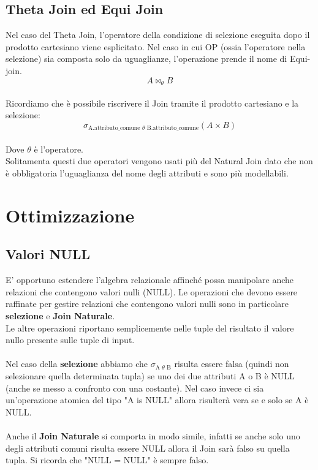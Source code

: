 \documentclass{report}
\begin{document}
\subsection{Theta Join ed Equi Join}
Nel caso del Theta Join, l'operatore della condizione di selezione eseguita dopo il prodotto cartesiano viene esplicitato. Nel caso in cui OP (ossia l'operatore nella selezione) sia composta solo da uguaglianze, l’operazione prende il nome di Equi-join.\\
$$ A \bowtie_{\text{$\theta$}}B$$\\
Ricordiamo che è possibile riscrivere il Join tramite il prodotto cartesiano e la selezione:\\
$$\sigma_{\text{A.attributo\_comune $\theta$ B.attributo\_comune}}(A \times B)$$\\
Dove $\theta$ è l'operatore.\\
Solitamenta questi due operatori vengono usati più del Natural Join dato che non è obbligatoria l'uguaglianza del nome degli attributi e sono più modellabili.\\

\newpage
\section{Ottimizzazione}
\subsection{Valori NULL}
E’ opportuno estendere l’algebra relazionale affinché possa manipolare anche relazioni che contengono valori nulli (NULL). Le operazioni che devono essere raffinate per gestire relazioni che contengono valori nulli sono in particolare \textbf{selezione} e \textbf{Join Naturale}.\\
Le altre operazioni riportano semplicemente nelle tuple del risultato il valore nullo presente sulle tuple di input.\\\\
Nel caso della \textbf{selezione} abbiamo che $\sigma_\text{A $\theta$ B}$ risulta essere falsa (quindi non selezionare quella determinata tupla) se uno dei due attributi A o B è NULL (anche se messo a confronto con una costante). Nel caso invece ci sia un'operazione atomica del tipo "A is NULL" allora risulterà vera se e solo se A è NULL.\\\\
Anche il \textbf{Join Naturale} si comporta in modo simile, infatti se anche solo uno degli attributi comuni risulta essere NULL allora il Join sarà falso su quella tupla. Si ricorda che "NULL = NULL" è sempre falso.\\
\end{document}

